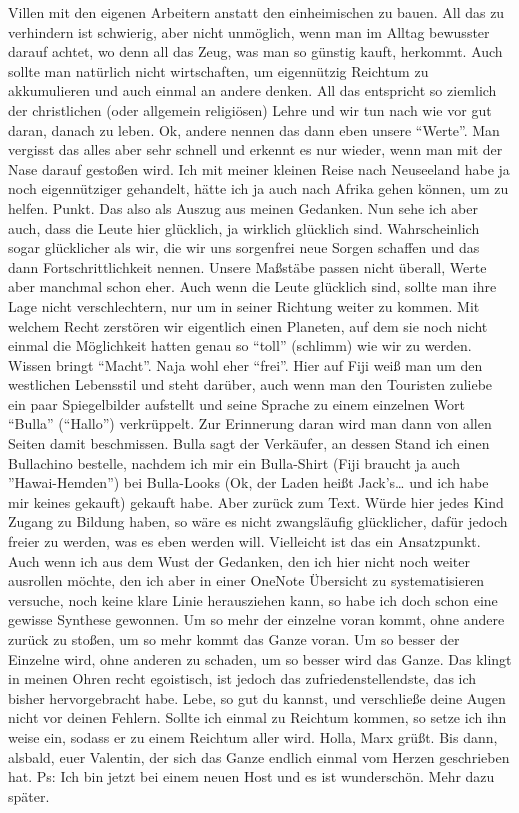 Villen mit den eigenen Arbeitern anstatt den einheimischen zu bauen. All
das zu verhindern ist schwierig, aber nicht unmöglich, wenn man im
Alltag bewusster darauf achtet, wo denn all das Zeug, was man so günstig
kauft, herkommt. Auch sollte man natürlich nicht wirtschaften, um
eigennützig Reichtum zu akkumulieren und auch einmal an andere denken.
All das entspricht so ziemlich der christlichen (oder allgemein
religiösen) Lehre und wir tun nach wie vor gut daran, danach zu leben.
Ok, andere nennen das dann eben unsere ``Werte''. Man vergisst das alles
aber sehr schnell und erkennt es nur wieder, wenn man mit der Nase
darauf gestoßen wird. Ich mit meiner kleinen Reise nach Neuseeland habe
ja noch eigennütziger gehandelt, hätte ich ja auch nach Afrika gehen
können, um zu helfen. Punkt. Das also als Auszug aus meinen Gedanken.
Nun sehe ich aber auch, dass die Leute hier glücklich, ja wirklich
glücklich sind. Wahrscheinlich sogar glücklicher als wir, die wir uns
sorgenfrei neue Sorgen schaffen und das dann Fortschrittlichkeit nennen.
Unsere Maßstäbe passen nicht überall, Werte aber manchmal schon eher.
Auch wenn die Leute glücklich sind, sollte man ihre Lage nicht
verschlechtern, nur um in seiner Richtung weiter zu kommen. Mit welchem
Recht zerstören wir eigentlich einen Planeten, auf dem sie noch nicht
einmal die Möglichkeit hatten genau so ``toll'' (schlimm) wie wir zu
werden. Wissen bringt ``Macht''. Naja wohl eher ``frei''. Hier auf Fiji
weiß man um den westlichen Lebensstil und steht darüber, auch wenn man
den Touristen zuliebe ein paar Spiegelbilder aufstellt und seine Sprache
zu einem einzelnen Wort ``Bulla'' (``Hallo'') verkrüppelt. Zur
Erinnerung daran wird man dann von allen Seiten damit beschmissen. Bulla
sagt der Verkäufer, an dessen Stand ich einen Bullachino bestelle,
nachdem ich mir ein Bulla-Shirt (Fiji braucht ja auch ''Hawai-Hemden'')
bei Bulla-Looks (Ok, der Laden heißt Jack's\ldots{} und ich habe mir
keines gekauft) gekauft habe. Aber zurück zum Text. Würde hier jedes
Kind Zugang zu Bildung haben, so wäre es nicht zwangsläufig glücklicher,
dafür jedoch freier zu werden, was es eben werden will. Vielleicht ist
das ein Ansatzpunkt. Auch wenn ich aus dem Wust der Gedanken, den ich
hier nicht noch weiter ausrollen möchte, den ich aber in einer OneNote
Übersicht zu systematisieren versuche, noch keine klare Linie
herausziehen kann, so habe ich doch schon eine gewisse Synthese
gewonnen. Um so mehr der einzelne voran kommt, ohne andere zurück zu
stoßen, um so mehr kommt das Ganze voran. Um so besser der Einzelne
wird, ohne anderen zu schaden, um so besser wird das Ganze. Das klingt
in meinen Ohren recht egoistisch, ist jedoch das zufriedenstellendste,
das ich bisher hervorgebracht habe. Lebe, so gut du kannst, und
verschließe deine Augen nicht vor deinen Fehlern. Sollte ich einmal zu
Reichtum kommen, so setze ich ihn weise ein, sodass er zu einem Reichtum
aller wird. Holla, Marx grüßt. Bis dann, alsbald, euer Valentin, der
sich das Ganze endlich einmal vom Herzen geschrieben hat. Ps: Ich bin
jetzt bei einem neuen Host und es ist wunderschön. Mehr dazu später.
